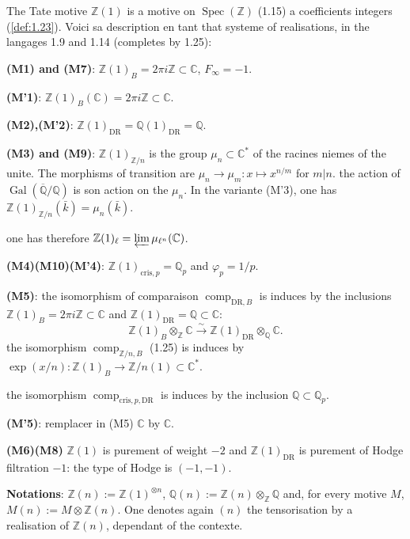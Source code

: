 \documentclass[12pt,a4paper]{article}
\theoremstyle{plain}
\theoremstyle{definition}
\theoremstyle{remark}
\DeclareMathOperator{\Spec}{Spec}
\DeclareMathOperator{\Gal}{Gal}
\providecommand{\Gal}{\operatorname{Gal}}
\providecommand{\Spec}{\operatorname{Spec}}
\providecommand{\limproj}{\varprojlim}
\providecommand{\DR}{\mathrm{DR}}
\providecommand{\cris}{\mathrm{cris}}
\providecommand{\comp}{\operatorname{comp}}
\begin{document}
The Tate motive $\mathbb{Z}(1)$ is a motive on $\Spec(\mathbb{Z})$ (1.15) a
coefficients integers (\ref{def:1.23}). Voici sa description en tant that systeme of
realisations, in the langages 1.9 and 1.14 (completes by 1.25):

\textbf{(M1) and (M7)}: $\mathbb{Z}(1)_B = 2\pi i \mathbb{Z} \subset \mathbb{C}$,
$F_\infty = -1$.

\textbf{(M'1)}: $\mathbb{Z}(1)_B(\mathbb{C}) = 2\pi i \mathbb{Z} \subset \mathbb{C}$.

\textbf{(M2),(M'2)}: $\mathbb{Z}(1)_{\DR} = \mathbb{Q}(1)_{\DR} = \mathbb{Q}$.

\textbf{(M3) and (M9)}: $\mathbb{Z}(1)_{\mathbb{Z}/n}$ is the group $\mu_n \subset
\mathbb{C}^*$ of the racines niemes of the unite. The morphisms of transition are
$\mu_n \to \mu_m: x \mapsto x^{n/m}$ for $m|n$. the action of
$\Gal(\overline{\mathbb{Q}}/\mathbb{Q})$ is son action on the $\mu_n$. In the variante
(M'3), one has $\mathbb{Z}(1)_{\mathbb{Z}/n}(\bar{k}) = \mu_n(\bar{k})$.

one has therefore $\mathbb{Z}(1)_\ell = \limproj \mu_{\ell^n}(\mathbb{C})$.

\textbf{(M4)(M10)(M'4)}: $\mathbb{Z}(1)_{\cris,p} = \mathbb{Q}_p$ and $\varphi_p = 1/p$.

\textbf{(M5)}: the isomorphism of comparaison $\comp_{\DR,B}$ is induces by the inclusions
$\mathbb{Z}(1)_B = 2\pi i \mathbb{Z} \subset \mathbb{C}$ and
$\mathbb{Z}(1)_{\DR} = \mathbb{Q} \subset \mathbb{C}$:
\[
\mathbb{Z}(1)_B \otimes_{\mathbb{Z}} \mathbb{C} \xrightarrow{\sim}
\mathbb{Z}(1)_{\DR} \otimes_{\mathbb{Q}} \mathbb{C}.
\]
the isomorphism $\comp_{\mathbb{Z}/n,B}$ (1.25) is induces by
$\exp(x/n): \mathbb{Z}(1)_B \to \mathbb{Z}/n(1) \subset \mathbb{C}^*$.

the isomorphism $\comp_{\cris,p,\DR}$ is induces by the inclusion $\mathbb{Q} \subset
\mathbb{Q}_p$.

\textbf{(M'5)}: remplacer in (M5) $\mathbb{C}$ by $\mathbb{C}$.

\textbf{(M6)(M8)} $\mathbb{Z}(1)$ is purement of weight $-2$ and
$\mathbb{Z}(1)_{\DR}$ is purement of Hodge filtration $-1$: the type of Hodge is
$(-1,-1)$.

\textbf{Notations}: $\mathbb{Z}(n) := \mathbb{Z}(1)^{\otimes n}$,
$\mathbb{Q}(n) := \mathbb{Z}(n) \otimes_{\mathbb{Z}} \mathbb{Q}$ and, for every motive $M$,
$M(n) := M \otimes \mathbb{Z}(n)$. One denotes again $(n)$ the tensorisation by a
realisation of $\mathbb{Z}(n)$, dependant of the contexte.
\end{document}
